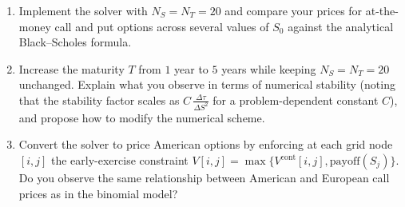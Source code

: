 \begin{problem}
\begin{enumerate}
        \[
        \mathbf{V}_{i+1}^{\top} = \mathbf{M}\,\mathbf{V}_i^{\top} + \mathbf{P}_i,
        \]
        where $\mathbf{V}_i$ is row $i$ of $\mathbf{V}$ (length $N_S + 1$), $\mathbf{P}_i$ is a length-$(N_S + 1)$ vector whose first and last entries impose the time-dependent Dirichlet boundary conditions at $\tau_{i+1}$ (with all interior entries zero), and $\mathbf{M}$ is the $(N_S + 1) \times (N_S + 1)$ tridiagonal-interior matrix
        \[
        \mathbf{M} = \begin{pmatrix}
        0 & 0 & 0 & 0 & 0 & \cdots & 0 \\
        a_1 & b_1 & c_1 & 0 & 0 & \cdots & 0 \\
        0 & a_2 & b_2 & c_2 & 0 & \cdots & 0 \\
        \vdots & \vdots & \ddots & \ddots & \ddots & \ddots & \vdots \\
        0 & 0 & \cdots & 0 & a_{N_S - 1} & b_{N_S - 1} & c_{N_S - 1} \\
        0 & 0 & \cdots & 0 & 0 & 0 & 0
        \end{pmatrix},
        \]
        with coefficients for $j = 1, \ldots, N_S - 1$ given by
        \begin{align*}
        k &= \frac{\Delta\tau}{2\,\Delta S^2}, &
        a_j &= k\sigma^2 S_j^2 - r k S_j\,\Delta S, \\
        b_j &= 1 - 2 k\sigma^2 S_j^2 - r\,\Delta\tau, &
        c_j &= k\sigma^2 S_j^2 + r k S_j\,\Delta S.
        \end{align*}
        \item Implement the solver with $N_S = N_T = 20$ and compare your prices for at-the-money call and put options across several values of $S_0$ against the analytical Black--Scholes formula.
        \item Increase the maturity $T$ from $1$ year to $5$ years while keeping $N_S = N_T = 20$ unchanged. Explain what you observe in terms of numerical stability (noting that the stability factor scales as $C\,\frac{\Delta\tau}{\Delta S^2}$ for a problem-dependent constant $C$), and propose how to modify the numerical scheme.
        \item Convert the solver to price American options by enforcing at each grid node $[i, j]$ the early-exercise constraint $V[i, j] = \max\{V^{\text{cont}}[i, j], \text{payoff}(S_j)\}$. Do you observe the same relationship between American and European call prices as in the binomial model?
    \end{enumerate}
\end{problem}

